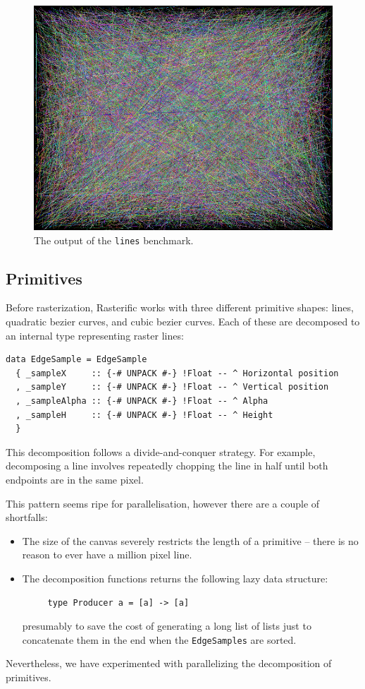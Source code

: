 \documentclass[12pt, a4paper]{article}
\begin{document}
\begin{figure}[h!]
  \centering
  \includegraphics[width=.4\linewidth]{../lines}
  \caption{The output of the \texttt{lines} benchmark.}
  \label{fig:lines-benchmark}
\end{figure}

\subsection{Primitives}
Before rasterization, Rasterific works with three different primitive shapes:
lines, quadratic bezier curves, and cubic bezier curves. Each of these are decomposed
to an internal type representing raster lines:
\begin{lstlisting}[caption={\texttt{EdgeSample} type -- represents a raster line.}]
data EdgeSample = EdgeSample
  { _sampleX     :: {-# UNPACK #-} !Float -- ^ Horizontal position
  , _sampleY     :: {-# UNPACK #-} !Float -- ^ Vertical position
  , _sampleAlpha :: {-# UNPACK #-} !Float -- ^ Alpha
  , _sampleH     :: {-# UNPACK #-} !Float -- ^ Height
  }
\end{lstlisting}
This decomposition follows a divide-and-conquer strategy. For example, decomposing a line
involves repeatedly chopping the line in half until both endpoints are in the same pixel.

This pattern seems ripe for parallelisation, however there are a couple of shortfalls:
\begin{itemize}
\item The size of the canvas severely restricts the length of a primitive -- there is no reason to ever
   have a million pixel line.
 \item The decomposition functions returns the following lazy data structure:
   \begin{lstlisting}
     type Producer a = [a] -> [a]\end{lstlisting}
   presumably to save the cost of generating a long list of lists just to concatenate them in the end
    when the \texttt{EdgeSamples} are sorted.
  \end{itemize}
  Nevertheless, we have experimented with parallelizing the decomposition of primitives.
\end{document}
